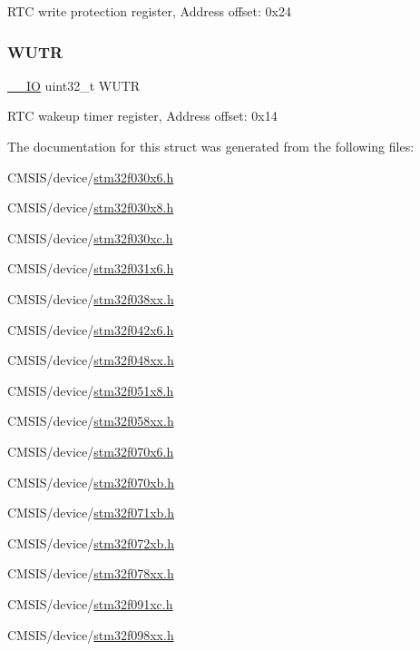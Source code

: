 R\+TC write protection register, Address offset\+: 0x24 \mbox{\label{struct_r_t_c___type_def_ac5b3c8be61045a304d3076d4714d29f2}} 
\subsubsection{\texorpdfstring{W\+U\+TR}{WUTR}}
{\footnotesize\ttfamily \hyperlink{core__sc300_8h_aec43007d9998a0a0e01faede4133d6be}{\+\_\+\+\_\+\+IO} uint32\+\_\+t W\+U\+TR}

R\+TC wakeup timer register, Address offset\+: 0x14 

The documentation for this struct was generated from the following files\+:\begin{DoxyCompactItemize}
\item 
C\+M\+S\+I\+S/device/\hyperlink{stm32f030x6_8h}{stm32f030x6.\+h}\item 
C\+M\+S\+I\+S/device/\hyperlink{stm32f030x8_8h}{stm32f030x8.\+h}\item 
C\+M\+S\+I\+S/device/\hyperlink{stm32f030xc_8h}{stm32f030xc.\+h}\item 
C\+M\+S\+I\+S/device/\hyperlink{stm32f031x6_8h}{stm32f031x6.\+h}\item 
C\+M\+S\+I\+S/device/\hyperlink{stm32f038xx_8h}{stm32f038xx.\+h}\item 
C\+M\+S\+I\+S/device/\hyperlink{stm32f042x6_8h}{stm32f042x6.\+h}\item 
C\+M\+S\+I\+S/device/\hyperlink{stm32f048xx_8h}{stm32f048xx.\+h}\item 
C\+M\+S\+I\+S/device/\hyperlink{stm32f051x8_8h}{stm32f051x8.\+h}\item 
C\+M\+S\+I\+S/device/\hyperlink{stm32f058xx_8h}{stm32f058xx.\+h}\item 
C\+M\+S\+I\+S/device/\hyperlink{stm32f070x6_8h}{stm32f070x6.\+h}\item 
C\+M\+S\+I\+S/device/\hyperlink{stm32f070xb_8h}{stm32f070xb.\+h}\item 
C\+M\+S\+I\+S/device/\hyperlink{stm32f071xb_8h}{stm32f071xb.\+h}\item 
C\+M\+S\+I\+S/device/\hyperlink{stm32f072xb_8h}{stm32f072xb.\+h}\item 
C\+M\+S\+I\+S/device/\hyperlink{stm32f078xx_8h}{stm32f078xx.\+h}\item 
C\+M\+S\+I\+S/device/\hyperlink{stm32f091xc_8h}{stm32f091xc.\+h}\item 
C\+M\+S\+I\+S/device/\hyperlink{stm32f098xx_8h}{stm32f098xx.\+h}\end{DoxyCompactItemize}
